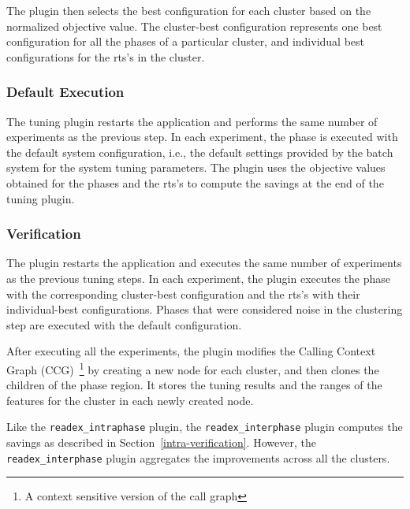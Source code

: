 The plugin then selects the best configuration for each cluster based on the normalized objective value. The cluster-best configuration represents one best configuration for all the phases of a particular cluster, and individual best configurations for the rts's in the cluster.

\subsubsection{Default Execution} \label{default-execution} 
The tuning plugin restarts the application and performs the same number of experiments as the previous step. In each experiment, the phase is executed with the default system configuration, i.e., the default settings provided by the batch system for the system tuning parameters. The plugin uses the objective values obtained for the phases and the rts's to compute the savings at the end of the tuning plugin.

\subsubsection{Verification} \label{verification} 
The plugin restarts the application and executes the same number of experiments as the previous tuning steps. In each experiment, the plugin executes the phase with the
corresponding cluster-best configuration and the rts's with their individual-best configurations. Phases that were considered noise in the clustering step are executed with the default configuration.

After executing all the experiments, the plugin modifies the Calling Context Graph (CCG)~\footnote{A context sensitive version of the call graph} by creating a new node for each cluster, and then clones the children of the phase region. It stores the tuning results and the ranges of the features for the cluster in each newly created node. 

Like the \texttt{readex\_intraphase} plugin, the \texttt{readex\_interphase} plugin computes the savings as described in Section~\ref{intra-verification}. However, the \texttt{readex\_interphase} plugin aggregates the improvements across all the clusters.


